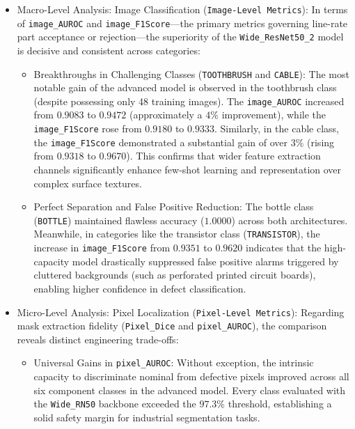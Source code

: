\documentclass{article}
\begin{document}
\begin{itemize}
	\item Macro-Level Analysis: Image Classification (\texttt{Image-Level Metrics}):
	In terms of \texttt{image\_AUROC} and \texttt{image\_F1Score}—the primary metrics governing line-rate part acceptance or rejection—the superiority of the \texttt{Wide\_ResNet50\_2} model is decisive and consistent across categories:
	\begin{itemize}
		\item Breakthroughs in Challenging Classes (\texttt{TOOTHBRUSH} and \texttt{CABLE}): The most notable gain of the advanced model is observed in the toothbrush class (despite possessing only 48 training images). The \texttt{image\_AUROC} increased from $0.9083$ to $0.9472$ (approximately a $4\%$ improvement), while the \texttt{image\_F1Score} rose from $0.9180$ to $0.9333$. Similarly, in the cable class, the \texttt{image\_F1Score} demonstrated a substantial gain of over $3\%$ (rising from $0.9318$ to $0.9670$). This confirms that wider feature extraction channels significantly enhance few-shot learning and representation over complex surface textures.
		
		\item Perfect Separation and False Positive Reduction: The bottle class (\texttt{BOTTLE}) maintained flawless accuracy ($1.0000$) across both architectures. Meanwhile, in categories like the transistor class (\texttt{TRANSISTOR}), the increase in \texttt{image\_F1Score} from $0.9351$ to $0.9620$ indicates that the high-capacity model drastically suppressed false positive alarms triggered by cluttered backgrounds (such as perforated printed circuit boards), enabling higher confidence in defect classification.
	\end{itemize}
	
	\item Micro-Level Analysis: Pixel Localization (\texttt{Pixel-Level Metrics}):
	Regarding mask extraction fidelity (\texttt{Pixel\_Dice} and \texttt{pixel\_AUROC}), the comparison reveals distinct engineering trade-offs:
	\begin{itemize}
		\item Universal Gains in \texttt{pixel\_AUROC}: Without exception, the intrinsic capacity to discriminate nominal from defective pixels improved across all six component classes in the advanced model. Every class evaluated with the \texttt{Wide\_RN50} backbone exceeded the $97.3\%$ threshold, establishing a solid safety margin for industrial segmentation tasks.
		

\end{itemize}
\end{itemize}
\end{document}
